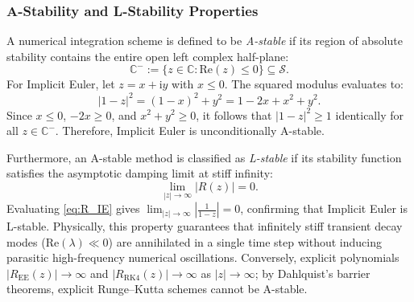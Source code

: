 \documentclass[11pt,a4paper]{article}
\theoremstyle{definition}
\theoremstyle{remark}
\begin{document}
\subsubsection{A-Stability and L-Stability Properties}
A numerical integration scheme is defined to be \emph{A-stable} if its region of absolute stability contains the entire open left complex half-plane:
\begin{equation}
\label{eq:a_stability_def}
\mathbb{C}^- := \{ z \in \mathbb{C} : \mathrm{Re}(z) \le 0 \} \subseteq \mathcal{S}.
\end{equation}
For Implicit Euler, let $z = x + \mathrm{i}y$ with $x \le 0$. The squared modulus evaluates to:
\begin{equation}
\label{eq:a_stability_proof}
|1 - z|^2 = (1 - x)^2 + y^2 = 1 - 2x + x^2 + y^2.
\end{equation}
Since $x \le 0$, $-2x \ge 0$, and $x^2 + y^2 \ge 0$, it follows that $|1 - z|^2 \ge 1$ identically for all $z \in \mathbb{C}^-$. Therefore, Implicit Euler is unconditionally A-stable.

Furthermore, an A-stable method is classified as \emph{L-stable} if its stability function satisfies the asymptotic damping limit at stiff infinity:
\begin{equation}
\label{eq:l_stability_def}
\lim_{|z| \to \infty} |R(z)| = 0.
\end{equation}
Evaluating \eqref{eq:R_IE} gives $\lim_{|z| \to \infty} \left|\frac{1}{1 - z}\right| = 0$, confirming that Implicit Euler is L-stable. Physically, this property guarantees that infinitely stiff transient decay modes ($\mathrm{Re}(\lambda) \ll 0$) are annihilated in a single time step without inducing parasitic high-frequency numerical oscillations. Conversely, explicit polynomials $|R_{\mathrm{EE}}(z)| \to \infty$ and $|R_{\mathrm{RK4}}(z)| \to \infty$ as $|z| \to \infty$; by Dahlquist's barrier theorems, explicit Runge--Kutta schemes cannot be A-stable.
\end{document}
